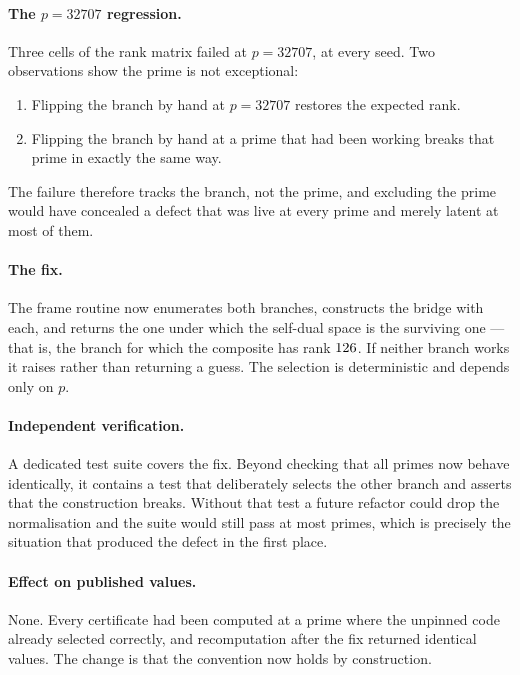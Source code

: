 \paragraph{The $p = 32707$ regression.}
Three cells of the rank matrix failed at $p = 32707$, at every seed. Two
observations show the prime is not exceptional:
\begin{enumerate}\itemsep2pt
\item Flipping the branch by hand at $p = 32707$ restores the expected rank.
\item Flipping the branch by hand at a prime that had been working breaks that
      prime in exactly the same way.
\end{enumerate}
The failure therefore tracks the branch, not the prime, and excluding the prime
would have concealed a defect that was live at every prime and merely latent at
most of them.

\paragraph{The fix.}
The frame routine now enumerates both branches, constructs the bridge with each,
and returns the one under which the self-dual space is the surviving one --- that
is, the branch for which the composite has rank $126$. If neither
branch works it raises rather than returning a guess. The selection is
deterministic and depends only on $p$.

\paragraph{Independent verification.}
A dedicated test suite covers the fix. Beyond checking that all primes now
behave identically, it contains a test that deliberately selects the other branch
and asserts that the construction breaks. Without that test a future refactor
could drop the normalisation and the suite would still pass at most primes,
which is precisely the situation that produced the defect in the first place.

\paragraph{Effect on published values.}
None. Every certificate had been computed at a prime where the unpinned code
already selected correctly, and recomputation after the fix returned identical
values. The change is that the convention now holds by construction.
